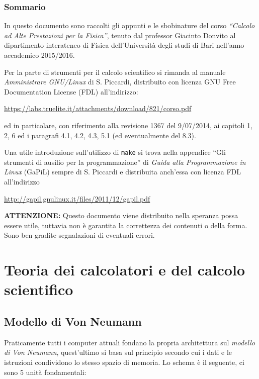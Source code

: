 \subsubsection{Sommario}\label{sommario}

In questo documento sono raccolti gli appunti e le sbobinature del corso
\emph{``Calcolo ad Alte Prestazioni per la Fisica''}, tenuto dal
professor Giacinto Donvito al dipartimento interateneo di Fisica
dell'Università degli studi di Bari nell'anno accademico 2015/2016.

Per la parte di strumenti per il calcolo scientifico si rimanda al
manuale \emph{Amministrare GNU/Linux} di S. Piccardi, distribuito con
licenza GNU Free Documentation License (FDL) all'indirizzo:

\url{https://labs.truelite.it/attachments/download/821/corso.pdf}

ed in particolare, con riferimento alla revisione 1367 del 9/07/2014, ai
capitoli 1, 2, 6 ed i paragrafi 4.1, 4.2, 4.3, 5.1 (ed eventualmente del
8.3).

Una utile introduzione sull'utilizzo di \texttt{make} si trova nella
appendice ``Gli strumenti di ausilio per la programmazione'' di
\emph{Guida alla Programmazione in Linux} (GaPiL) sempre di S. Piccardi
e distribuita anch'essa con licenza FDL all'indirizzo

\url{http://gapil.gnulinux.it/files/2011/12/gapil.pdf}

\textbf{ATTENZIONE:} Questo documento viene distribuito nella speranza
possa essere utile, tuttavia non è garantita la correttezza dei
contenuti o della forma. Sono ben gradite segnalazioni di eventuali
errori.

\section{Teoria dei calcolatori e del calcolo
scientifico}\label{teoria-dei-calcolatori-e-del-calcolo-scientifico}

\subsection{Modello di Von Neumann}\label{modello-di-von-neumann}

Praticamente tutti i computer attuali fondano la propria architettura
sul \emph{modello di Von Neumann}, quest'ultimo si basa sul principio
secondo cui i dati e le istruzioni condividono lo stesso spazio di
memoria. Lo schema è il seguente, ci sono 5 unità fondamentali:

